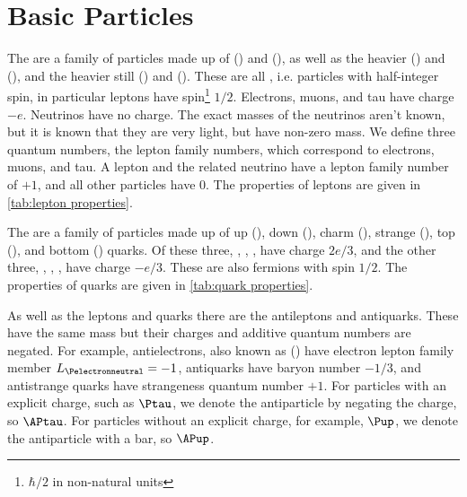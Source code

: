 \documentclass[fleqn]{NotesClass}
\begin{document}
    \section{Basic Particles}
    The  are a family of particles made up of  (\Pe) and  (\Pnue), as well as the heavier  (\Pmu) and  (\Pnumu), and the heavier still  (\Ptau) and  (\Pnutau).
    These are all , i.e. particles with half-integer spin, in particular leptons have spin\footnote{\(\hbar/2\) in non-natural units} \(1/2\).
    Electrons, muons, and tau have charge \(-e\).
    Neutrinos have no charge.
    The exact masses of the neutrinos aren't known, but it is known that they are very light, but have non-zero mass.
    We define three quantum numbers, the lepton family numbers, which correspond to electrons, muons, and tau.
    A lepton and the related neutrino have a lepton family number of \(+1\), and all other particles have 0.
    The properties of leptons are given in \cref{tab:lepton properties}.
    
    The  are a family of particles made up of up (\Pup), down (\Pdown), charm (\Pcharm), strange (\Pstrange), top (\Ptop), and bottom (\Pbottom) quarks.
    Of these three, \Pup, \Pcharm, \Ptop, have charge \(2e/3\), and the other three, \Pdown, \Pstrange, \Pbottom, have charge \(-e/3\).
    These are also fermions with spin \(1/2\).
    The properties of quarks are given in \cref{tab:quark properties}.
    
    As well as the leptons and quarks there are the antileptons and antiquarks.
    These have the same mass but their charges and additive quantum numbers are negated.
    For example, antielectrons, also known as  (\APe) have electron lepton family member \(L_{\Pelectronneutral} = -1\), antiquarks have baryon number \(-1/3\), and antistrange quarks have strangeness quantum number \(+1\).
    For particles with an explicit charge, such as \(\Ptau\), we denote the antiparticle by negating the charge, so \(\APtau\).
    For particles without an explicit charge, for example, \(\Pup\), we denote the antiparticle with a bar, so \(\APup\).
    
\end{document}
